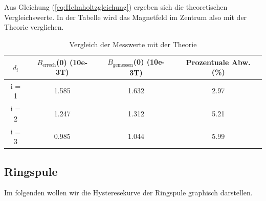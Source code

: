   Aus Gleichung (\ref{eq:Helmholtzgleichung}) ergeben sich die theoretischen Vergleichswerte.
  In der Tabelle wird das Magnetfeld im Zentrum also mit der Theorie verglichen.

  \begin{table}
    \centering
    \caption{Vergleich der Messwerte mit der Theorie}
    \begin{tabular}{c c c c }
      \toprule
      $d_{i}$ & $B_{\text{errech}}$(0) (10e-3T) &  $B_{\text{gemessen}}$(0) (10e-3T) & Prozentuale Abw. (\%)\\
      \midrule
      i = 1  & 1.585 &         1.632  &     2.97 \\ 
      i = 2  & 1.247 &         1.312  &     5.21 \\ 
      i = 3  & 0.985 &         1.044  &     5.99 \\ 
      \bottomrule
    \end{tabular}
  \end{table}

\subsection{Ringspule}

Im folgenden wollen wir die Hysteresekurve der Ringspule graphisch darstellen.

